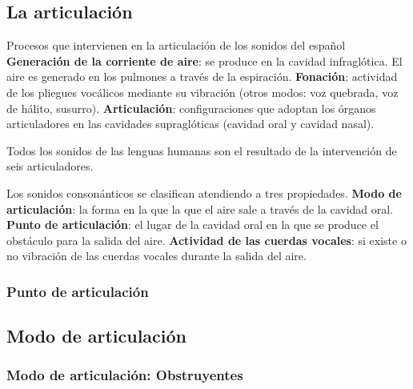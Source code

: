 \documentclass[12pt]{article}
\begin{document}
\subsection{La articulación}


	Procesos que intervienen en la articulación de los sonidos del español
\pex
\a \textbf{Generación de la corriente de aire}: se produce en la cavidad infraglótica. El aire es generado en los pulmones a través de la espiración.
\a \textbf{Fonación}: actividad de los pliegues vocálicos mediante su vibración (otros modos: voz quebrada, voz de hálito, susurro).
\a \textbf{Articulación}: configuraciones que adoptan los órganos articuladores en las cavidades supraglóticas (cavidad oral y cavidad nasal).
\xe



	Todos los sonidos de las lenguas humanas son el resultado de la intervención de seis articuladores.

\ex {}
\xe	




	Los sonidos consonánticos se clasifican atendiendo a tres propiedades.
	\pex
\a	\textbf{Modo de articulación}: la forma en la que la que el aire sale a través de la cavidad oral.
\a	\textbf{Punto de articulación}: el lugar de la cavidad oral en la que se produce el obstáculo para la salida del aire.
 \a	\textbf{Actividad de las cuerdas vocales}: si existe o no vibración de las cuerdas vocales durante la salida del aire.
\xe






	\subsubsection{Punto de articulación}
		\begin{center}
		\end{center}



\subsection{Modo de articulación}

	\subsubsection{Modo de articulación: Obstruyentes}
	
\end{document}
